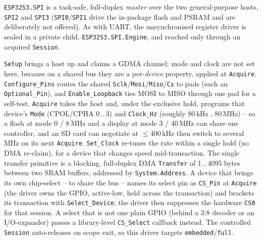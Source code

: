 \texttt{ESP32S3.SPI} is a task-safe, full-duplex \emph{master} over the two
general-purpose hosts, \texttt{SPI2} and \texttt{SPI3} (\texttt{SPI0}/\texttt{SPI1}
drive the in-package flash and PSRAM and are deliberately not offered). As with
UART, the unsynchronised register driver is sealed in a private child,
\texttt{ESP32S3.SPI.Engine}, and reached only through an acquired
\texttt{Session}.

\texttt{Setup} brings a host up and claims a GDMA channel; mode and clock are not
set here, because on a shared bus they are a per-\emph{device} property, applied at
\texttt{Acquire}. \texttt{Configure\_Pins} routes the shared
\texttt{Sclk}/\texttt{Mosi}/\texttt{Miso}/\texttt{Cs} to pads (each an
\texttt{Optional\_Pin}), and \texttt{Enable\_Loopback} ties MOSI to MISO through
one pad for a self-test. \texttt{Acquire} takes the host and, under the exclusive
hold, programs that device's \texttt{Mode} (CPOL/CPHA 0\,..\,3) and \texttt{Clock\_Hz}
(roughly 80\,kHz\,..\,80\,MHz) -- so a flash at mode 0 / 8\,MHz and a display at
mode 3 / 40\,MHz can share one controller, and an SD card can negotiate at
$\le$400\,kHz then switch to several MHz on its next \texttt{Acquire}.
\texttt{Set\_Clock} re-tunes the rate within a single hold (no DMA re-claim), for a
device that changes speed mid-transaction. The single transfer primitive is a
blocking, full-duplex DMA \texttt{Transfer} of 1\,..\,4095 bytes between two SRAM
buffers, addressed by \texttt{System.Address}. A device that brings its own
chip-select -- to share the bus -- names its select pin as \texttt{CS\_Pin} at
\texttt{Acquire} (the driver owns the GPIO, active-low, held across the
transaction) and brackets its transaction with \texttt{Select\_Device}; the driver
then suppresses the hardware \texttt{CS0} for that session. A select that is not one
plain GPIO (behind a 3:8 decoder or an I/O-expander) passes a library-level
\texttt{CS\_Select} callback instead. The controlled \texttt{Session} auto-releases
on scope exit, so this driver targets \texttt{embedded}/\texttt{full}.

